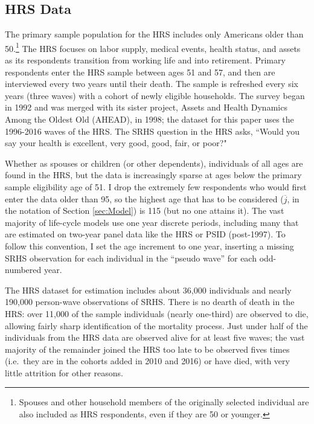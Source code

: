 \documentclass[12pt,pdftex,letterpaper]{article}
\newcommand{\Age}{j}
\newcommand{\AgeMax}{\overline{\Age}}
\begin{document}
\subsection{HRS Data}\label{sec:HRS}

The primary sample population for the HRS includes only Americans older than 50.\footnote{Spouses and other household members of the originally selected individual are also included as HRS respondents, even if they are 50 or younger.}  The HRS focuses on labor supply, medical events, health status, and assets as its respondents transition from working life and into retirement.  Primary respondents enter the HRS sample between ages 51 and 57, and then are interviewed every two years until their death.  The sample is refreshed every six years (three waves) with a cohort of newly eligible households.  The survey began in 1992 and was merged with its sister project, Assets and Health Dynamics Among the Oldest Old (AHEAD), in 1998; the dataset for this paper uses the 1996-2016 waves of the HRS. The SRHS question in the HRS asks, ``Would you say your health is excellent, very good, good, fair, or poor?"

Whether as spouses or children (or other dependents), individuals of all ages are found in the HRS, but the data is increasingly sparse at ages below the primary sample eligibility age of 51.  I drop the extremely few respondents who would first enter the data older than 95, so the highest age that has to be considered ($\AgeMax$, in the notation of Section \ref{sec:Model}) is 115 (but no one attains it). The vast majority of life-cycle models use one year discrete periods, including many that are estimated on two-year panel data like the HRS or PSID (post-1997).  To follow this convention, I set the age increment to one year, inserting a missing SRHS observation for each individual in the ``pseudo wave'' for each odd-numbered year.

The HRS dataset for estimation includes about 36,000 individuals and nearly 190,000 person-wave observations of SRHS. There is no dearth of death in the HRS: over 11,000 of the sample individuals (nearly one-third) are observed to die, allowing fairly sharp identification of the mortality process.  Just under half of the individuals from the HRS data are observed alive for at least five waves; the vast majority of the remainder joined the HRS too late to be observed fives times (i.e.\ they are in the cohorts added in 2010 and 2016) or have died, with very little attrition for other reasons.
\end{document}
